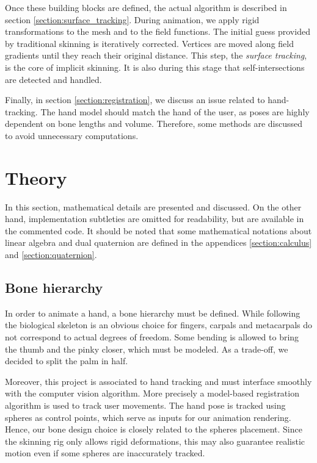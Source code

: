 \documentclass[a4paper,10pt]{article}
\begin{document}
\begin{multicols}{2}
Once these building blocks are defined, the actual algorithm is described in section \ref{section:surface_tracking}.
During animation, we apply rigid transformations to the mesh and to the field functions.
The initial guess provided by traditional skinning is iteratively corrected.
Vertices are moved along field gradients until they reach their original distance.
This step, the \emph{surface tracking}, is the core of implicit skinning.
It is also during this stage that self-intersections are detected and handled.

Finally, in section \ref{section:registration}, we discuss an issue related to hand-tracking.
The hand model should match the hand of the user, as poses are highly dependent on bone lengths and volume.
Therefore, some methods are discussed to avoid unnecessary computations.


\section{Theory}
\label{section:theory}

In this section, mathematical details are presented and discussed.
On the other hand, implementation subtleties are omitted for readability, but are available in the commented code.
It should be noted that some mathematical notations about linear algebra and dual quaternion are defined in the appendices \ref{section:calculus} and \ref{section:quaternion}.


\subsection{Bone hierarchy}
\label{section:bone_hierarchy}

In order to animate a hand, a bone hierarchy must be defined.
While following the biological skeleton is an obvious choice for fingers, carpals and metacarpals do not correspond to actual degrees of freedom.
Some bending is allowed to bring the thumb and the pinky closer, which must be modeled.
As a trade-off, we decided to split the palm in half.

Moreover, this project is associated to hand tracking and must interface smoothly with the computer vision algorithm.
More precisely a model-based registration algorithm is used to track user movements.
The hand pose is tracked using spheres as control points, which serve as inputs for our animation rendering.
Hence, our bone design choice is closely related to the spheres placement.
Since the skinning rig only allows rigid deformations, this may also guarantee realistic motion even if some spheres are inaccurately tracked.


\end{multicols}
\end{document}
